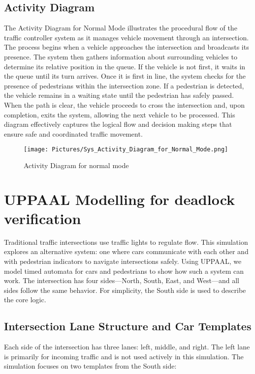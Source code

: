 \documentclass[conference]{IEEEtran}
\begin{document}
\subsection{Activity Diagram}
The Activity Diagram for Normal Mode illustrates the procedural flow of the traffic controller system as it manages vehicle movement through an intersection. The process begins when a vehicle approaches the intersection and broadcasts its presence. The system then gathers information about surrounding vehicles to determine its relative position in the queue. If the vehicle is not first, it waits in the queue until its turn arrives. Once it is first in line, the system checks for the presence of pedestrians within the intersection zone. If a pedestrian is detected, the vehicle remains in a waiting state until the pedestrian has safely passed. When the path is clear, the vehicle proceeds to cross the intersection and, upon completion, exits the system, allowing the next vehicle to be processed. This diagram effectively captures the logical flow and decision making steps that ensure safe and coordinated traffic movement.
\begin{figure*}[t]
    \centering
    \texttt{[image: Pictures/Sys\_Activity\_Diagram\_for\_Normal\_Mode.png]}
    \caption{Activity Diagram for normal mode}
    \label{fig:Activity Diagram}
\end{figure*}

\section{UPPAAL Modelling for deadlock verification}
Traditional traffic intersections use traffic lights to regulate flow. This simulation explores an alternative system: one where cars communicate with each other and with pedestrian indicators to navigate intersections safely. Using UPPAAL, we model timed automata for cars and pedestrians to show how such a system can work. The intersection has four sides—North, South, East, and West—and all sides follow the same behavior. For simplicity, the South side is used to describe the core logic.
\subsection{Intersection Lane Structure and Car Templates}
Each side of the intersection has three lanes: left, middle, and right. The left lane is primarily for incoming traffic and is not used actively in this simulation. The simulation focuses on two templates from the South side:
\end{document}
